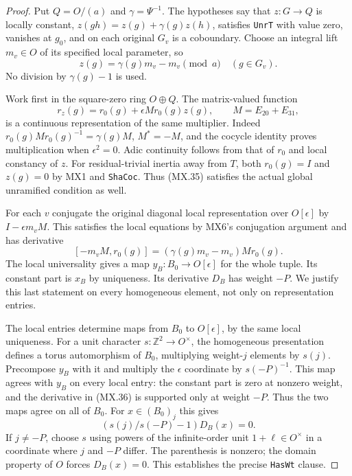 \begin{proof}
Put $Q=O/(a)$ and $\gamma=\Psi^{-1}$.
The hypotheses say that $z:G\to Q$ is locally constant,
$z(gh)=z(g)+\gamma(g)z(h)$, satisfies
\texttt{UnrT} with value zero, vanishes at $g_0$, and
on each original $G_v$ is a coboundary.
Choose an integral lift $m_v\in O$ of its specified
local parameter, so
\[
             z(g)=\gamma(g)m_v-m_v\pmod a
                                      \quad(g\in G_v).
 \tag{MX.34}
\]
No division by $\gamma(g)-1$ is used.

Work first in the square-zero ring $O\oplus Q$.
The matrix-valued function
\[
 r_z(g)=r_0(g)+\epsilon M r_0(g)z(g),
                    \qquad M=E_{20}+E_{31},
 \tag{MX.35}
\]
is a continuous representation of the same multiplier.
Indeed
$r_0(g)M r_0(g)^{-1}=\gamma(g)M$,
$M^*=-M$, and the cocycle identity proves multiplication
when $\epsilon^2=0$.  Adic continuity follows from that
of $r_0$ and local constancy of $z$.
For residual-trivial inertia away from $T$, both
$r_0(g)=I$ and $z(g)=0$ by MX1 and \texttt{ShaCoc}.
Thus (MX.35) satisfies the actual global unramified
condition as well.

For each $v$ conjugate the original diagonal local
representation over $O[\epsilon]$ by
$I-\epsilon m_vM$.  This satisfies the local equations
by MX6's conjugation argument and has derivative
\[
 [-m_vM,r_0(g)]
       =(\gamma(g)m_v-m_v)Mr_0(g).
 \tag{MX.36}
\]
The local universality gives a map $y_B:B_0\to O[\epsilon]$
for the whole tuple.  Its constant part is $x_B$ by
uniqueness.  Its derivative $D_B$ has weight $-P$.
We justify this last statement on every homogeneous
element, not only on representation entries.

The local entries determine maps from $B_0$ to
$O[\epsilon]$, by the same local uniqueness.
For a unit character $s:\mathbb Z^2\to O^\times$,
the homogeneous presentation defines a torus automorphism
of $B_0$, multiplying weight-$j$ elements by $s(j)$.
Precompose $y_B$ with it and multiply the $\epsilon$
coordinate by $s(-P)^{-1}$.
This map agrees with $y_B$ on every local entry:
the constant part is zero at nonzero weight, and the
derivative in (MX.36) is supported only at weight $-P$.
Thus the two maps agree on all of $B_0$.
For $x\in(B_0)_j$ this gives
\[
           (s(j)/s(-P)-1)D_B(x)=0.
 \tag{MX.37}
\]
If $j\ne-P$, choose $s$ using powers of the
infinite-order unit $1+\ell\in O^\times$ in a coordinate
where $j$ and $-P$ differ.  The parenthesis is nonzero;
the domain property of $O$ forces $D_B(x)=0$.
This establishes the precise \texttt{HasWt} clause.


\end{proof}

